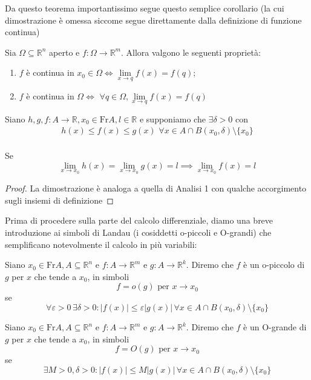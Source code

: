 \noindent Da questo teorema importantissimo segue questo semplice corollario (la cui dimostrazione è omessa siccome segue direttamente dalla definizione di funzione continua)
\begin{cor}
	Sia $\Omega \subseteq \mathbb{R}^n$ aperto e $f: \Omega \to \mathbb{R}^m$. Allora valgono le seguenti proprietà:
	\begin{enumerate}[label=\protect\circled{\arabic*}]
		\item $f$ è continua in $x_0 \in \Omega \iff \lim\limits_{x \to q} f(x) = f(q)$;
		\item $f$ è continua in $\Omega \iff \, \, \forall q \in \Omega, \lim\limits_{x \to q} f(x) = f(q)$
	\end{enumerate}
\end{cor}
\begin{theorem}
Siano $h, g, f: A \to \mathbb{R}, x_0 \in \text{Fr} A, l \in \mathbb{R}$ e supponiamo che $\exists \delta > 0$ con
\begin{align*}
h(x) \leq f(x) \leq g(x) \, \, \forall x \in A \cap B(x_0, \delta) \setminus \{ x_0 \}
\end{align*} \\
Se 
$$\lim\limits_{x \to x_0} h(x) = \lim\limits_{x \to x_0} g(x) = l \implies \lim_{x \to x_0} f(x) = l$$
\end{theorem}
\begin{proof}
La dimostrazione è analoga a quella di Analisi 1 con qualche accorgimento sugli insiemi di definizione
\end{proof}
\noindent Prima di procedere sulla parte del calcolo differenziale, diamo una breve introduzione ai simboli di Landau (i cosiddetti o-piccoli e O-grandi) che semplificano notevolmente il calcolo in più variabili:
\begin{definition}[o-piccolo]
Siano $x_0 \in \text{Fr} A, A \subseteq \mathbb{R}^n$ e $f: A \to \mathbb{R}^m$ e $g: A \to \mathbb{R}^k$. Diremo che $f$ è un o-piccolo di $g$ per $x$ che tende a $x_0$, in simboli
$$
f = o(g) \text{ per } x \to x_0
$$
se $$\forall \varepsilon > 0 \, \exists \delta > 0 : |f(x)| \leq \varepsilon |g(x)| \, \forall x \in A \cap B(x_0, \delta) \setminus \{ x_0 \}$$
\end{definition}
\begin{definition}[O-grande]
Siano $x_0 \in \text{Fr} A, A \subseteq \mathbb{R}^n$ e $f: A \to \mathbb{R}^m$ e $g: A \to \mathbb{R}^k$. Diremo che $f$ è un O-grande di $g$ per $x$ che tende a $x_0$, in simboli
$$
f = O(g) \text{ per } x \to x_0
$$
se $$\exists M > 0, \delta > 0 : |f(x)| \leq M|g(x)| \, \forall x \in A \cap B(x_0, \delta) \setminus \{ x_0 \} $$
\end{definition}
